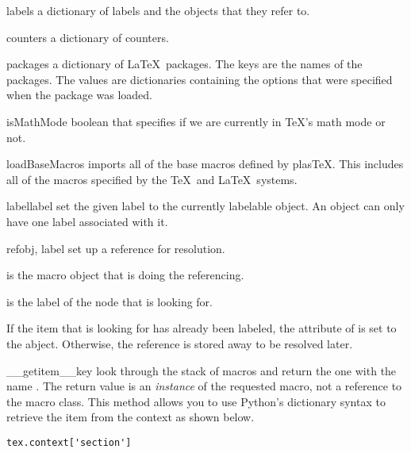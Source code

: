 \documentclass{manual}
\newcommand{\plasTeX}{plas\TeX}
\begin{document}
\begin{memberdesc}[Context]{labels}
a dictionary of labels and the objects that they refer to.
\end{memberdesc}

\begin{memberdesc}[Context]{counters}
a dictionary of counters.
\end{memberdesc}

\begin{memberdesc}[Context]{packages}
a dictionary of \LaTeX\ packages.  The keys are the names of the packages.
The values are dictionaries containing the options that were specified
when the package was loaded.
\end{memberdesc}

\begin{memberdesc}[Context]{isMathMode}
boolean that specifies if we are currently in \TeX's math mode or not.
\end{memberdesc}

\begin{methoddesc}[Context]{loadBaseMacros}{}
imports all of the base macros defined by \plasTeX.  This includes all of
the macros specified by the \TeX\ and \LaTeX\ systems.
\end{methoddesc}

\begin{methoddesc}[Context]{label}{label}
set the given label to the currently labelable object.  An object can 
only have one label associated with it.
\end{methoddesc}

\begin{methoddesc}[Context]{ref}{obj, label}
set up a reference for resolution.  

 is the macro object that is doing the referencing.

 is the label of the node that  is looking for.

If the item that  is looking for has already been labeled, 
the  attribute of  is set to the abject.  
Otherwise, the reference is stored away to be resolved later. 
\end{methoddesc}

\begin{methoddesc}[Context]{\_\_getitem\_\_}{key}
look through the stack of macros and return the one with the name .
The return value is an \emph{instance} of the requested macro,
not a reference to the macro class.
This method allows you to use Python's dictionary syntax to retrieve
the item from the context as shown below.
\begin{verbatim}
tex.context['section']
\end{verbatim}
\end{methoddesc}
\end{document}
